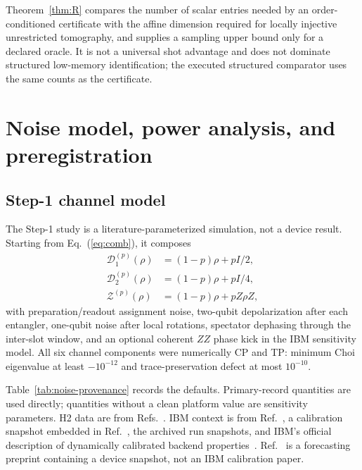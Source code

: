 \documentclass[aps,prl,onecolumn,superscriptaddress,nofootinbib]{revtex4-2}
\begin{document}
Theorem~\ref{thm:R} compares the number of scalar entries needed by an order-conditioned certificate with the affine dimension required for locally injective unrestricted tomography, and supplies a sampling upper bound only for a declared oracle.  It is not a universal shot advantage and does not dominate structured low-memory identification; the executed structured comparator uses the same counts as the certificate.

\section{Noise model, power analysis, and preregistration}
\label{sec:benchmark}

\subsection{Step-1 channel model}

The Step-1 study is a literature-parameterized simulation, not a device result.  Starting from Eq.~(\ref{eq:comb}), it composes
\begin{align}
 \mathcal D_1^{(p)}(\rho)&=(1-p)\rho+pI/2,\nonumber\\
 \mathcal D_2^{(p)}(\rho)&=(1-p)\rho+pI/4,\nonumber\\
 \mathcal Z^{(p)}(\rho)&=(1-p)\rho+pZ\rho Z,
 \label{eq:noise-channels}
\end{align}
with preparation/readout assignment noise, two-qubit depolarization after each entangler, one-qubit noise after local rotations, spectator dephasing through the inter-slot window, and an optional coherent $ZZ$ phase kick in the IBM sensitivity model.  All six channel components were numerically CP and TP: minimum Choi eigenvalue at least $-10^{-12}$ and trace-preservation defect at most $10^{-10}$.

Table~\ref{tab:noise-provenance} records the defaults.  Primary-record quantities are used directly; quantities without a clean platform value are sensitivity parameters.  H2 data are from Refs.~\cite{Moses2023Racetrack,DeCross2025RCS}.  IBM context is from Ref.~\cite{AbuGhanem2025IBM}, a calibration snapshot embedded in Ref.~\cite{Polche2026KQRC}, the archived run snapshots, and IBM's official description of dynamically calibrated backend properties~\cite{IBMBackendDetails2026}.  Ref.~\cite{Polche2026KQRC} is a forecasting preprint containing a device snapshot, not an IBM calibration paper.
\end{document}
